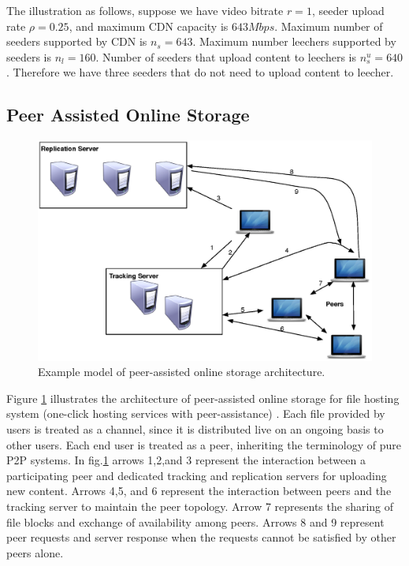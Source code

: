 \documentclass[conference]{IEEEtran}
\begin{document}
The illustration as follows, suppose we have video bitrate $r=1$, seeder upload rate $\rho=0.25$, and maximum CDN capacity is $643Mbps$. 
Maximum number of seeders supported by CDN is $n_s=643$.
Maximum number leechers supported by seeders is $n_l=160$.  
Number of seeders that upload content to leechers is $n_{s}^{u}=640$.  
Therefore we have three seeders that do not need to upload content to leecher. 

\subsection{Peer Assisted Online Storage}

\begin{figure}[thb]
\begin{center}
\includegraphics[scale=0.4]{graphs/fs2you-arch.eps}
\end{center}
\caption{Example model of peer-assisted online storage architecture.}
\label{fig:fs2you}
\end{figure} 

Figure \ref{fig:fs2you} illustrates the architecture of peer-assisted online storage for file hosting system (one-click hosting services with peer-assistance) \cite{5061997}.
Each file provided by users is treated as a channel, since it is distributed live on an ongoing basis to other users. 
Each end user is treated as a peer, inheriting the terminology of pure P2P systems.
In fig.\ref{fig:fs2you} arrows 1,2,and 3 represent the interaction between a participating peer and dedicated tracking and replication servers for uploading new content.
Arrows 4,5, and 6 represent the interaction between peers and the tracking server to maintain the peer topology. 
Arrow 7 represents the sharing of file blocks and exchange of availability among peers. 
Arrows 8 and 9 represent peer requests and server response when the requests cannot be satisfied by other peers alone. 
\end{document}
